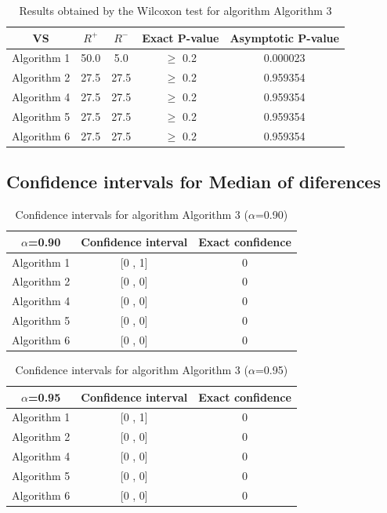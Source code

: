 \documentclass[a4paper,10pt]{article}
\begin{document}
\begin{table}[!htp]
\centering\small
\begin{tabular}{
|c|c|c|c|c|}
\hline
 VS & $R^{+}$ & $R^{-}$ & Exact P-value & Asymptotic P-value \\ \hline 
Algorithm 1 & 50.0 & 5.0 & $\geq$ 0.2 & 0.000023\\ \hline 
Algorithm 2 & 27.5 & 27.5 & $\geq$ 0.2 & 0.959354\\ \hline 
Algorithm 4 & 27.5 & 27.5 & $\geq$ 0.2 & 0.959354\\ \hline 
Algorithm 5 & 27.5 & 27.5 & $\geq$ 0.2 & 0.959354\\ \hline 
Algorithm 6 & 27.5 & 27.5 & $\geq$ 0.2 & 0.959354\\ \hline 

\end{tabular}
\caption{Results obtained by the Wilcoxon test for algorithm Algorithm 3}
\end{table}

\subsection{Confidence intervals for Median of diferences}

\begin{table}[!htp]
\centering\small
\begin{tabular}{
|c|c|c|}
\hline
 $\alpha$=0.90 & Confidence interval & Exact confidence \\ \hline 
Algorithm 1 & [0 , 1] & 0\\ \hline 
Algorithm 2 & [0 , 0] & 0\\ \hline 
Algorithm 4 & [0 , 0] & 0\\ \hline 
Algorithm 5 & [0 , 0] & 0\\ \hline 
Algorithm 6 & [0 , 0] & 0\\ \hline 

\end{tabular}
\caption{Confidence intervals for algorithm Algorithm 3 ($\alpha$=0.90)}
\end{table}
\begin{table}[!htp]
\centering\small
\begin{tabular}{
|c|c|c|}
\hline
 $\alpha$=0.95 & Confidence interval & Exact confidence \\ \hline 
Algorithm 1 & [0 , 1] & 0\\ \hline 
Algorithm 2 & [0 , 0] & 0\\ \hline 
Algorithm 4 & [0 , 0] & 0\\ \hline 
Algorithm 5 & [0 , 0] & 0\\ \hline 
Algorithm 6 & [0 , 0] & 0\\ \hline 

\end{tabular}
\caption{Confidence intervals for algorithm Algorithm 3 ($\alpha$=0.95)}
\end{table}
\end{document}
